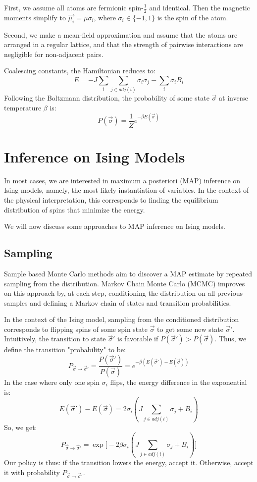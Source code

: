 \documentclass{article}
\begin{document}
First, we assume all atoms are fermionic spin-$\frac{1}{2}$ and identical. 
Then the magnetic moments simplify to $\vec{\mu_i} = \mu \sigma_i$, where 
$\sigma_i \in \{-1, 1\}$ is the spin of the atom. 

Second, we make a mean-field approximation and assume that the atoms are 
arranged in a regular lattice, and that the strength of pairwise interactions 
are negligible for non-adjacent pairs.

Coalescing constants, the Hamiltonian reduces to:
\begin{equation}\label{isingE}
    E = -J\sum_i \sum_{j \in adj(i)} \sigma_i \sigma_j - \sum_i \sigma_i B_i
\end{equation}
Following the Boltzmann distribution, the probability of some state 
$\vec{\sigma}$ at inverse temperature $\beta$ is:
\begin{equation} \label{boltzmann}
    P(\vec{\sigma}) = \frac{1}{Z}e^{-\beta E(\vec{\sigma})} 
\end{equation}

\section{Inference on Ising Models}

In most cases, we are interested in maximum a posteriori (MAP) inference on 
Ising models, namely, the most likely instantiation of variables. 
In the context of the physical interpretation, this corresponds to finding the 
equilibrium distribution of spins that minimize the energy. 

We will now discuss some approaches to MAP inference on Ising models. 

\subsection{Sampling}

Sample based Monte Carlo methods aim to discover a MAP estimate by repeated 
sampling from the distribution. 
Markov Chain Monte Carlo (MCMC) improves on this approach by, at each step, 
conditioning the distribution on all previous samples and defining a Markov 
chain of states and transition probabilities. 

In the context of the Ising model, sampling from the conditioned distribution 
corresponds to flipping spins of some spin state $\vec{\sigma}$ to get some 
new state $\vec{\sigma}'$. 
Intuitively, the transition to state $\vec{\sigma}'$ is favorable if 
$P(\vec{\sigma}') > P(\vec{\sigma})$. 
Thus, we define the transition "probability" to be:
\[
    P_{\vec{\sigma} \rightarrow \vec{\sigma}'}
    = \frac{P(\vec{\sigma}')}{P(\vec{\sigma})}
    = e^{-\beta(E(\vec{\sigma}') - E(\vec{\sigma}))} 
\]
In the case where only one spin $\sigma_i$ flips, the energy difference in the 
exponential is:
\[
    E(\vec{\sigma}') - E(\vec{\sigma}) = 2 \sigma_i (J \sum_{j \in adj(i)} \sigma_j + B_i)
\]
So, we get:
\[
    P_{\vec{\sigma} \rightarrow \vec{\sigma}'}
    = \exp \Bigr [-2 \beta \sigma_i (J \sum_{j \in adj(i)} \sigma_j + B_i) \Bigr ]
\]
Our policy is thus: if the transition lowers the energy, accept it. 
Otherwise, accept it with probability $P_{\vec{\sigma} \rightarrow \vec{\sigma}'}$. 
\end{document}
